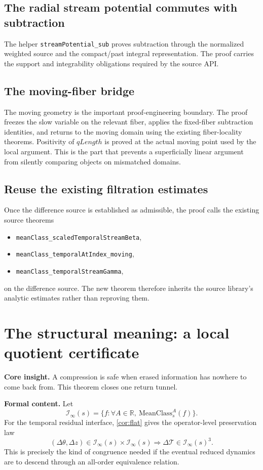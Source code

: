 \documentclass[11pt]{article}
\theoremstyle{highend}
\theoremstyle{definition}
\newcommand{\MeanClass}{\mathrm{MeanClass}}
\newcommand{\Iinf}{\mathcal I_{\infty}}
\newcommand{\Tmap}{\mathcal T}
\begin{document}
\subsection{The radial stream potential commutes with subtraction}
The helper \texttt{streamPotential\_sub} proves subtraction through the normalized weighted source and the compact/past integral representation. The proof carries the support and integrability obligations required by the source API.

\subsection{The moving-fiber bridge}
The moving geometry is the important proof-engineering boundary. The proof freezes the slow variable on the relevant fiber, applies the fixed-fiber subtraction identities, and returns to the moving domain using the existing fiber-locality theorems. Positivity of \(qLength\) is proved at the actual moving point used by the local argument. This is the part that prevents a superficially linear argument from silently comparing objects on mismatched domains.

\subsection{Reuse the existing filtration estimates}
Once the difference source is established as admissible, the proof calls the existing source theorems
\begin{itemize}
  \item \texttt{meanClass\_scaledTemporalStreamBeta},
  \item \texttt{meanClass\_temporalAtIndex\_moving},
  \item \texttt{meanClass\_temporalStreamGamma},
\end{itemize}
on the difference source. The new theorem therefore inherits the source library's analytic estimates rather than reproving them.

\section{The structural meaning: a local quotient certificate}
\begin{eurekabox}
\textbf{Core insight.} A compression is safe when erased information has nowhere to come back from. This theorem closes one return tunnel.
\end{eurekabox}
\noindent\textbf{Formal content.}
Let
\[
\Iinf(s)=\{f:\forall A\in\mathbb R,\ \MeanClass_s^A(f)\}.
\]
For the temporal residual interface, \cref{cor:flat} gives the operator-level preservation law
\[
(\Delta\theta,\Delta z)\in \Iinf(s)\times\Iinf(s)
\Longrightarrow
\Delta \Tmap\in \Iinf(s)^3.
\]
This is precisely the kind of congruence needed if the eventual reduced dynamics are to descend through an all-order equivalence relation.
\end{document}
